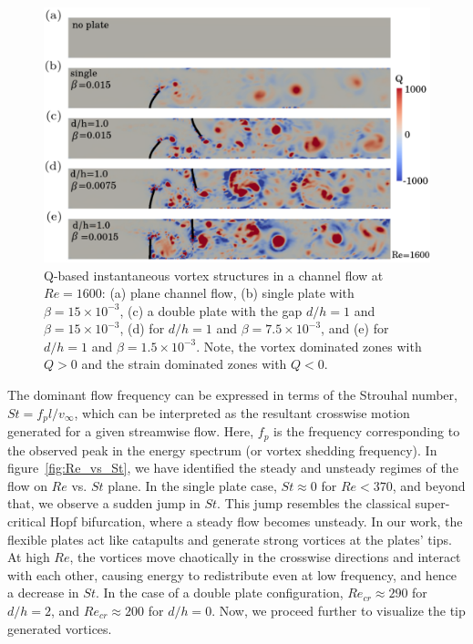 \documentclass[aps,pre,twocolumn,aps,longbibliography]{revtex4-1}
\begin{document}
	\begin{figure}[b]
		\begin{minipage}[c]{1\linewidth}
			\includegraphics[width=1\linewidth]{Fig14.pdf} 
		\end{minipage} 
		\caption{Q-based instantaneous vortex structures in a channel flow at $Re=1600$: (a) plane channel flow, (b) single plate with $\beta=15\times10^{-3}$, (c) a double plate with the gap $d/h=1$ and $\beta=15\times10^{-3}$, (d) for $d/h=1$ and $\beta=7.5\times10^{-3}$, and (e) for $d/h=1$ and $\beta=1.5\times10^{-3}$. Note, the vortex dominated zones with $Q>0$ and the strain dominated zones with $Q<0$. }
		\label{fig:Re1600_Qvort}
	\end{figure}
	
	
	The dominant flow frequency can be expressed in terms of the Strouhal number, $St=f_p l/v_{\infty}$, which can be interpreted as the resultant crosswise motion generated for a given streamwise flow. Here, $f_p$ is the frequency corresponding to the observed peak in the energy spectrum (or vortex shedding frequency). In figure~\ref{fig:Re_vs_St}, we have identified the steady and unsteady regimes of the flow on $Re$ vs. $St$ plane. In the single plate case, $St\approx 0$ for $Re<370$, and beyond that, we observe a sudden jump in $St$. This jump resembles the classical super-critical Hopf bifurcation, where a steady flow becomes unsteady. In our work, the flexible plates act like catapults and generate strong vortices at the plates' tips. At high $Re$, the vortices move chaotically in the crosswise directions and interact with each other, causing energy to redistribute even at low frequency, and hence a decrease in $St$. In the case of a double plate configuration, $Re_{cr}\approx 290$ for $d/h=2$, and $Re_{cr}\approx 200$ for $d/h=0$. Now, we proceed further to visualize the tip generated vortices. 
	
\end{document}
